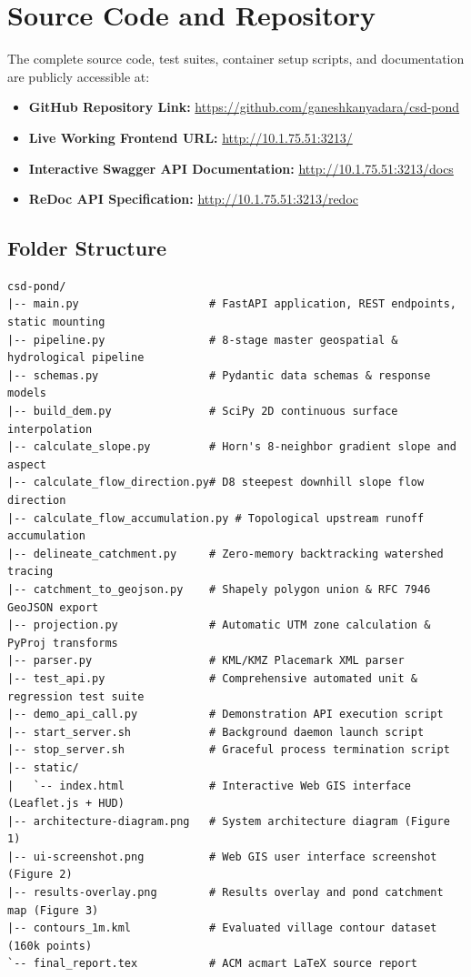 \documentclass[manuscript,screen,review]{acmart}
\begin{document}
\appendix

\section{Source Code and Repository}
\label{sec:repo}

The complete source code, test suites, container setup scripts, and documentation are publicly accessible at:
\begin{itemize}
    \item \textbf{GitHub Repository Link:} \url{https://github.com/ganeshkanyadara/csd-pond}
    \item \textbf{Live Working Frontend URL:} \url{http://10.1.75.51:3213/}
    \item \textbf{Interactive Swagger API Documentation:} \url{http://10.1.75.51:3213/docs}
    \item \textbf{ReDoc API Specification:} \url{http://10.1.75.51:3213/redoc}
\end{itemize}

\subsection{Folder Structure}
\begin{verbatim}
csd-pond/
|-- main.py                    # FastAPI application, REST endpoints, static mounting
|-- pipeline.py                # 8-stage master geospatial & hydrological pipeline
|-- schemas.py                 # Pydantic data schemas & response models
|-- build_dem.py               # SciPy 2D continuous surface interpolation
|-- calculate_slope.py         # Horn's 8-neighbor gradient slope and aspect
|-- calculate_flow_direction.py# D8 steepest downhill slope flow direction
|-- calculate_flow_accumulation.py # Topological upstream runoff accumulation
|-- delineate_catchment.py     # Zero-memory backtracking watershed tracing
|-- catchment_to_geojson.py    # Shapely polygon union & RFC 7946 GeoJSON export
|-- projection.py              # Automatic UTM zone calculation & PyProj transforms
|-- parser.py                  # KML/KMZ Placemark XML parser
|-- test_api.py                # Comprehensive automated unit & regression test suite
|-- demo_api_call.py           # Demonstration API execution script
|-- start_server.sh            # Background daemon launch script
|-- stop_server.sh             # Graceful process termination script
|-- static/
|   `-- index.html             # Interactive Web GIS interface (Leaflet.js + HUD)
|-- architecture-diagram.png   # System architecture diagram (Figure 1)
|-- ui-screenshot.png          # Web GIS user interface screenshot (Figure 2)
|-- results-overlay.png        # Results overlay and pond catchment map (Figure 3)
|-- contours_1m.kml            # Evaluated village contour dataset (160k points)
`-- final_report.tex           # ACM acmart LaTeX source report
\end{verbatim}
\end{document}
